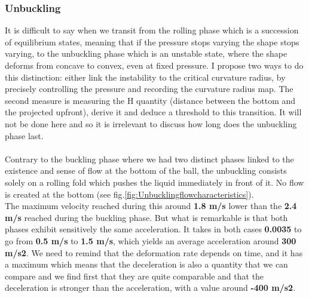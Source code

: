 \documentclass[a4paper,10pt]{report}
\begin{document}
\subsubsection{Unbuckling}
It is difficult to say when we transit from the rolling phase which is a succession of equilibrium states, meaning that if the pressure stops varying the shape stops varying, to the unbuckling phase which is an unstable state, where the shape deforms from concave to convex, even at fixed pressure.
I propose two ways to do this distinction: either link the instability to the critical curvature radius, by precisely controlling the pressure and recording the curvature radius map. The second measure is measuring the H quantity (distance between the bottom and the projected upfront), derive it and deduce a threshold to this transition.
It will not be done here and so it is irrelevant to discuss how long does the unbuckling phase last.
\paragraph{}
Contrary to the buckling phase where we had two distinct phases linked to the existence and sense of flow at the bottom of the ball, the unbuckling consists solely on a rolling fold which pushes the liquid immediately in front of it. No flow is created at the bottom (see fig.\ref{fig:Unbucklingflowcharacteristics}).\\
The maximum velocity reached during this around \textbf{1.8 m/s} lower than the \textbf{2.4 m/s} reached during the buckling phase. But what is remarkable is that both phases exhibit sensitively the same acceleration. It takes in both cases \textbf{0.0035} to go from \textbf{0.5 m/s} to \textbf{1.5 m/s}, which yields an average acceleration around \textbf{300 m/s2}.
\newline
We need to remind that the deformation rate depends on time, and it has a maximum which means that the deceleration is also a quantity that we can compare and we find first that they are quite comparable and that the deceleration is stronger than the acceleration, with a value around \textbf{-400 m/s2}.
\end{document}
